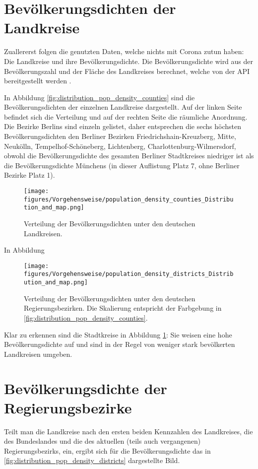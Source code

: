 \section{Bevölkerungsdichten der Landkreise}
Zuallererst folgen die genutzten Daten, welche nichts mit Corona zutun haben: Die Landkreise und ihre Bevölkerungsdichte. Die Bevölkerungsdichte wird aus der Bevölkerungszahl und der Fläche des Landkreises berechnet, welche von der API bereitgestellt werden .

In Abbildung \autoref{fig:distribution_pop_density_counties} sind die Bevölkerungsdichten der einzelnen Landkreise dargestellt. Auf der linken Seite befindet sich die Verteilung und auf der rechten Seite die räumliche Anordnung.
Die Bezirke Berlins sind einzeln gelistet, daher entsprechen die sechs höchsten Bevölkerungsdichten den Berliner Bezirken  Friedrichshain-Kreuzberg, Mitte, Neukölln, Tempelhof-Schöneberg, Lichtenberg, Charlottenburg-Wilmersdorf, obwohl die Bevölkerungsdichte des gesamten Berliner Stadtkreises niedriger ist als die Bevölkerungsdichte Münchens (in dieser Auflistung Platz 7, ohne Berliner Bezirke Platz 1).

\begin{figure}[H]
    \centering
    \texttt{[image: figures/Vorgehensweise/population\_density\_counties\_Distribution\_and\_map.png]}
    \caption{Verteilung der Bevölkerungsdichten unter den deutschen Landkreisen.}
    \label{fig:distribution_pop_density_counties}
\end{figure}

In Abbildung 


\begin{figure}[H]
    \centering
    \texttt{[image: figures/Vorgehensweise/population\_density\_districts\_Distribution\_and\_map.png]}
    \caption{Verteilung der Bevölkerungsdichten unter den deutschen Regierungsbezirken. Die Skalierung entspricht der Farbgebung in \autoref{fig:distribution_pop_density_counties}.}
    \label{fig:distribution_pop_density_districts}
\end{figure}

Klar zu erkennen sind die Stadtkreise in Abbildung \ref{fig:distribution_pop_density_counties}: Sie weisen eine hohe Bevölkerungsdichte auf und sind in der Regel von weniger stark bevölkerten Landkreisen umgeben.

\section{Bevölkerungsdichte der Regierungsbezirke}
Teilt man die Landkreise nach den ersten beiden Kennzahlen des Landkreises, die des Bundeslandes und die des aktuellen (teils auch vergangenen) Regierungsbezirks, ein, ergibt sich für die Bevölkerungsdichte das in \autoref{fig:distribution_pop_density_districts} dargestellte Bild.